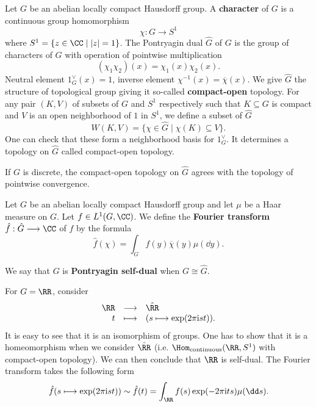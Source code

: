 \begin{definitionenv}
    Let $G$ be an abelian locally compact Hausdorff group.
    A \textbf{character} of $G$ is a continuous group homomorphism
    $$\chi : G \longrightarrow S^1$$
    where $S^1 = \{z \in \CC \mid |z| = 1\}$.
    The Pontryagin dual $\hat{G}$ of $G$ is the group of characters of $G$ with operation of pointwise multiplication
    $$(\chi_1 \chi_2)(x) = \chi_1(x) \chi_2(x).$$
    Neutral element $1^\vee_{G} (x) = 1$, inverse element $\chi^{-1} (x) = \overline{\chi}(x)$.
    We give $\hat{G}$ the structure of topological group giving it so-called \textbf{compact-open} topology.
    For any pair $(K,V)$ of subsets of $G$ and $S^1$ respectively such that $K \subseteq G$ is compact and $V$ is an open neighborhood of $1$ in $S^1$, we define a subset of $\hat{G}$
    $$W(K,V) = \{\chi \in \hat{G} \mid \chi(K) \subseteq V\}.$$
    One can check that these form a neighborhood basis for $1^\vee_{G}$.
    It determines a topology on $\hat{G}$ called compact-open topology.
\end{definitionenv}

\begin{remark}
    If $G$ is discrete, the compact-open topology on $\hat{G}$ agrees with the topology of pointwise convergence.
\end{remark}

\begin{definitionenv}
    Let $G$ be an abelian locally compact Hausdorff group and let $\mu$ be a Haar measure on $G$.
    Let $f \in L^1(G,\CC)$.
    We define the \textbf{Fourier transform} $\hat{f} : \hat{G} \longrightarrow \CC$ of $f$ by the formula
    $$\hat{f}(\chi) = \int_{G} f(y) \overline{\chi}(y)\mu(\dd y).$$
\end{definitionenv}

\begin{definitionenv}
    We say that $G$ is \textbf{Pontryagin self-dual} when $G \cong \hat{G}$.
\end{definitionenv}

\begin{exampleenv}
    For $G = \RR$, consider
    $$\begin{array}{rcl}
        \RR & \longrightarrow & \hat{\RR}\\
        t & \longmapsto & (s \longmapsto \exp(2 \pi \mathrm{i} s t)).
    \end{array}$$
    It is easy to see that it is an isomorphism of groups.
    One has to show that it is a homeomorphism when we consider $\hat{\RR}$ (i.e. $\Hom_{\text{continuous}}(\RR,S^1)$ with compact-open topology).
    We can then conclude that $\RR$ is self-dual.
    The Fourier transform takes the following form
    $$\hat{f} (s \longmapsto \exp(2 \pi \mathrm{i} s t)) \sim \hat{f}(t) = \int_{\RR} f(s) \exp(-2 \pi \mathrm{i} t s) \mu(\dd s).$$
\end{exampleenv}

